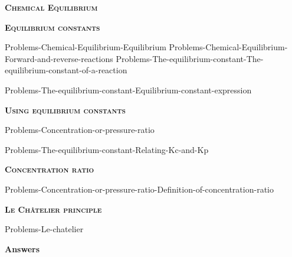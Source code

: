 \documentclass[main.tex]{subfiles}
\begin{document}
\newpage

\fancyhfoffset[E,O]{0pt}
\setlength{\columnsep}{30pt}
\begin{conclusion}
\end{conclusion}
\begin{multicols*}{2}\setcounter{numA}{1}



{\raggedright\textsc{\textbf{Chemical Equilibrium }}\par}



{\raggedright\textsc{\textbf{Equilibrium constants }}\par}






{Problems-Chemical-Equilibrium-Equilibrium}
{Problems-Chemical-Equilibrium-Forward-and-reverse-reactions}
{Problems-The-equilibrium-constant-The-equilibrium-constant-of-a-reaction}

{Problems-The-equilibrium-constant-Equilibrium-constant-expression}






{\raggedright\textsc{\textbf{Using equilibrium constants }}\par}
{Problems-Concentration-or-pressure-ratio}

{Problems-The-equilibrium-constant-Relating-Kc-and-Kp}



{\raggedright\textsc{\textbf{Concentration ratio }}\par}
{Problems-Concentration-or-pressure-ratio-Definition-of-concentration-ratio}




{\raggedright\textsc{\textbf{Le Ch\^{a}telier principle}}\par}
{Problems-Le-chatelier}









\end{multicols*}

\newpage
\begin{answersenvironment}
\begin{minipage}[c]{1\textwidth}
\begin{localsize}{10}
{\Large \bf Answers}
 \printsolutions[byID={1,3,5,7,9,11,13,15,17}]
\end{localsize}
\end{minipage}\end{answersenvironment}
\end{document}
